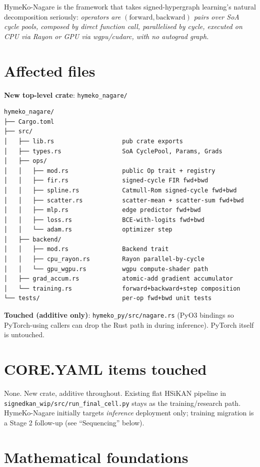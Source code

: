 \documentclass[10pt]{article}
\begin{document}
HymeKo-Nagare is the framework that takes signed-hypergraph learning's
natural decomposition seriously: \emph{operators are
$(\text{forward}, \text{backward})$ pairs over SoA cycle pools,
composed by direct function call, parallelised by cycle, executed on
CPU via Rayon or GPU via wgpu/cudarc, with no autograd graph.}

\section*{Affected files}

\textbf{New top-level crate}: \texttt{hymeko\_nagare/}
\begin{lstlisting}
hymeko_nagare/
├── Cargo.toml
├── src/
│   ├── lib.rs                   pub crate exports
│   ├── types.rs                 SoA CyclePool, Params, Grads
│   ├── ops/
│   │   ├── mod.rs               public Op trait + registry
│   │   ├── fir.rs               signed-cycle FIR fwd+bwd
│   │   ├── spline.rs            Catmull-Rom signed-cycle fwd+bwd
│   │   ├── scatter.rs           scatter-mean + scatter-sum fwd+bwd
│   │   ├── mlp.rs               edge predictor fwd+bwd
│   │   ├── loss.rs              BCE-with-logits fwd+bwd
│   │   └── adam.rs              optimizer step
│   ├── backend/
│   │   ├── mod.rs               Backend trait
│   │   ├── cpu_rayon.rs         Rayon parallel-by-cycle
│   │   └── gpu_wgpu.rs          wgpu compute-shader path
│   ├── grad_accum.rs            atomic-add gradient accumulator
│   └── training.rs              forward+backward+step composition
└── tests/                       per-op fwd+bwd unit tests
\end{lstlisting}

\textbf{Touched (additive only)}: \texttt{hymeko\_py/src/nagare.rs}
(PyO3 bindings so PyTorch-using callers can drop the Rust path in
during inference). PyTorch itself is untouched.

\section*{CORE.YAML items touched}

None. New crate, additive throughout. Existing flat HSiKAN pipeline
in \texttt{signedkan\_wip/src/run\_final\_cell.py} stays as the
training/research path. HymeKo-Nagare initially targets \emph{inference}
deployment only; training migration is a Stage 2 follow-up (see
``Sequencing'' below).

\section*{Mathematical foundations}
\end{document}
